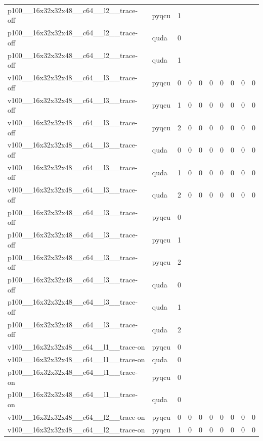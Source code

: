 \begin{table}[htbp]
\begin{tabular}{@{}llrrrrrrrr@{}}
p100\_\_16x32x32x48\_\_c64\_\_l2\_\_trace-off & pyqcu & 1 &  &  &  &  &  &  &  \\
p100\_\_16x32x32x48\_\_c64\_\_l2\_\_trace-off & quda & 0 &  &  &  &  &  &  &  \\
p100\_\_16x32x32x48\_\_c64\_\_l2\_\_trace-off & quda & 1 &  &  &  &  &  &  &  \\
v100\_\_16x32x32x48\_\_c64\_\_l3\_\_trace-off & pyqcu & 0 & 0 & 0 & 0 & 0 & 0 & 0 & 0 \\
v100\_\_16x32x32x48\_\_c64\_\_l3\_\_trace-off & pyqcu & 1 & 0 & 0 & 0 & 0 & 0 & 0 & 0 \\
v100\_\_16x32x32x48\_\_c64\_\_l3\_\_trace-off & pyqcu & 2 & 0 & 0 & 0 & 0 & 0 & 0 & 0 \\
v100\_\_16x32x32x48\_\_c64\_\_l3\_\_trace-off & quda & 0 & 0 & 0 & 0 & 0 & 0 & 0 & 0 \\
v100\_\_16x32x32x48\_\_c64\_\_l3\_\_trace-off & quda & 1 & 0 & 0 & 0 & 0 & 0 & 0 & 0 \\
v100\_\_16x32x32x48\_\_c64\_\_l3\_\_trace-off & quda & 2 & 0 & 0 & 0 & 0 & 0 & 0 & 0 \\
p100\_\_16x32x32x48\_\_c64\_\_l3\_\_trace-off & pyqcu & 0 &  &  &  &  &  &  &  \\
p100\_\_16x32x32x48\_\_c64\_\_l3\_\_trace-off & pyqcu & 1 &  &  &  &  &  &  &  \\
p100\_\_16x32x32x48\_\_c64\_\_l3\_\_trace-off & pyqcu & 2 &  &  &  &  &  &  &  \\
p100\_\_16x32x32x48\_\_c64\_\_l3\_\_trace-off & quda & 0 &  &  &  &  &  &  &  \\
p100\_\_16x32x32x48\_\_c64\_\_l3\_\_trace-off & quda & 1 &  &  &  &  &  &  &  \\
p100\_\_16x32x32x48\_\_c64\_\_l3\_\_trace-off & quda & 2 &  &  &  &  &  &  &  \\
v100\_\_16x32x32x48\_\_c64\_\_l1\_\_trace-on & pyqcu & 0 &  &  &  &  &  &  &  \\
v100\_\_16x32x32x48\_\_c64\_\_l1\_\_trace-on & quda & 0 &  &  &  &  &  &  &  \\
p100\_\_16x32x32x48\_\_c64\_\_l1\_\_trace-on & pyqcu & 0 &  &  &  &  &  &  &  \\
p100\_\_16x32x32x48\_\_c64\_\_l1\_\_trace-on & quda & 0 &  &  &  &  &  &  &  \\
v100\_\_16x32x32x48\_\_c64\_\_l2\_\_trace-on & pyqcu & 0 & 0 & 0 & 0 & 0 & 0 & 0 & 0 \\
v100\_\_16x32x32x48\_\_c64\_\_l2\_\_trace-on & pyqcu & 1 & 0 & 0 & 0 & 0 & 0 & 0 & 0 \\

\end{tabular}
\end{table}
